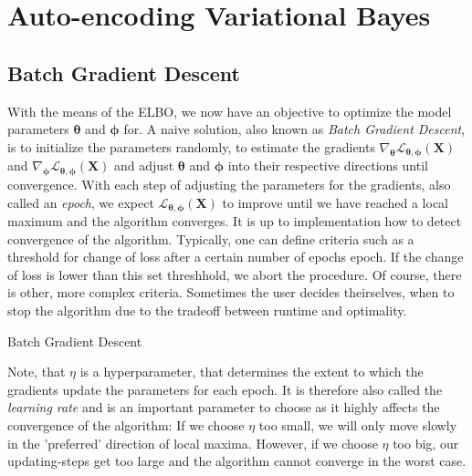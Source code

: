 \documentclass[12pt]{report}
\theoremstyle{definition}
\begin{document}
\section{Auto-encoding Variational Bayes}
\subsection{Batch Gradient Descent}
With the means of the ELBO, we now have an objective to optimize the model parameters $\pmb{\theta}$ and $\pmb{\phi}$ for. A naive solution, also known as \emph{Batch Gradient Descent}, is to initialize the parameters randomly, to estimate the gradients $\nabla_{\pmb{\theta}}\mathcal{L}_{\pmb{\theta}, \pmb{\phi}}(\mathbf{X})$ and $\nabla_{\pmb{\pmb{\phi}}}\mathcal{L}_{\pmb{\theta}, \pmb{\phi}}(\mathbf{X})$ and adjust $\pmb{\theta}$ and $\pmb{\phi}$ into their respective directions until convergence. With each step of adjusting the parameters for the gradients, also called an \emph{epoch}, we expect $\mathcal{L}_{\pmb{\theta}, \pmb{\phi}}(\mathbf{X})$ to improve until we have reached a local maximum and the algorithm converges. It is up to implementation how to detect convergence of the algorithm. Typically, one can define criteria such as a threshold for change of loss after a certain number of epochs epoch. If the change of loss is lower than this set threshhold, we abort the procedure. Of course, there is other, more complex criteria. Sometimes the user decides theirselves, when to stop the algorithm due to the tradeoff between runtime and optimality.
\begin{algorithm}[H]
\SetAlgoLined
{} 
\caption{Batch Gradient Descent}
\end{algorithm} 
Note, that $\eta$ is a hyperparameter, that determines the extent to which the gradients update the parameters for each epoch. It is therefore also called the \emph{learning rate} and is an important parameter to choose as it highly affects the convergence of the algorithm: If we choose $\eta$ too small, we will only move slowly in the 'preferred' direction of local maxima. However, if we choose $\eta$ too big, our updating-steps get too large and the algorithm cannot converge in the worst case. 
\end{document}
